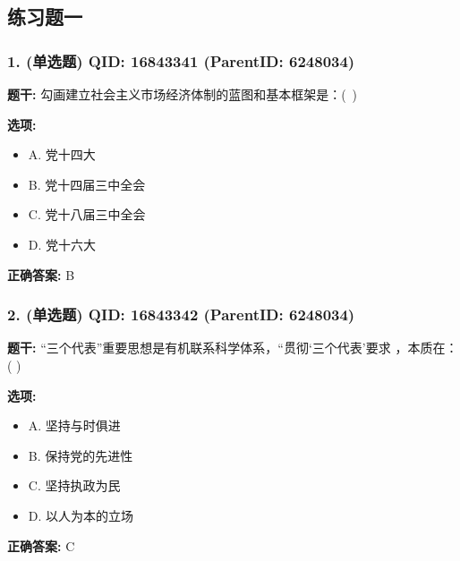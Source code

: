 \documentclass[12pt,UTF8]{ctexart}
\begin{document}
\subsection*{练习题一}

\subsubsection*{1. (单选题) \small QID: 16843341 (ParentID: 6248034)}

\textbf{题干:}
勾画建立社会主义市场经济体制的蓝图和基本框架是：( )



\textbf{选项:}
\begin{itemize}[leftmargin=*]

  \item A. 党十四大

  \item B. 党十四届三中全会

  \item C. 党十八届三中全会

  \item D. 党十六大

\end{itemize}

\textbf{正确答案:}
B

\vspace{0.3em}\hrulefill\vspace{0.7em}

\subsubsection*{2. (单选题) \small QID: 16843342 (ParentID: 6248034)}

\textbf{题干:}
“三个代表”重要思想是有机联系科学体系，“贯彻‘三个代表’要求 ，本质在：( )



\textbf{选项:}
\begin{itemize}[leftmargin=*]

  \item A. 坚持与时俱进

  \item B. 保持党的先进性

  \item C. 坚持执政为民

  \item D. 以人为本的立场

\end{itemize}

\textbf{正确答案:}
C
\end{document}
